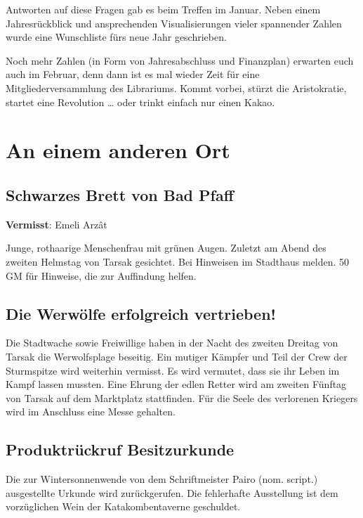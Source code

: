 Antworten auf diese Fragen gab es beim Treffen im Januar.
Neben einem Jahresrückblick und ansprechenden Visualisierungen vieler spannender Zahlen wurde eine Wunschliste fürs neue Jahr geschrieben.

Noch mehr Zahlen (in Form von Jahresabschluss und Finanzplan) erwarten euch auch im Februar, denn dann ist es mal wieder Zeit für eine Mitgliederversammlung des Librariums.
Kommt vorbei, stürzt die Aristokratie, startet eine Revolution … oder trinkt einfach nur einen Kakao.


\section{An einem anderen Ort}
\setsubsubsecheadstyle{\centering\bfseries}

\subsection{Schwarzes Brett von Bad Pfaff}
\begin{center}
    \textbf{Vermisst}:
    Emeli Arzât
\end{center}
\vspace{-1.5em}
\noindent
Junge, rothaarige Menschenfrau mit grünen Augen.
Zuletzt am Abend des zweiten Helmstag von Tarsak gesichtet.
Bei Hinweisen im Stadthaus melden.
50 GM für Hinweise, die zur Auffindung helfen.


\subsection{Die Werwölfe erfolgreich vertrieben!}

Die Stadtwache sowie Freiwillige haben in der Nacht des zweiten Dreitag von Tarsak die Werwolfsplage beseitig. 
Ein mutiger Kämpfer und Teil der Crew der Sturmspitze wird weiterhin vermisst. 
Es wird vermutet, dass sie ihr Leben im Kampf lassen mussten.
Eine Ehrung der edlen Retter wird am zweiten Fünftag von Tarsak auf dem Marktplatz stattfinden. Für die Seele des verlorenen Kriegers wird im Anschluss eine Messe gehalten.


\subsection{Produktrückruf Besitzurkunde}
Die zur Wintersonnenwende von dem Schriftmeister Pairo (nom. script.) ausgestellte Urkunde wird zurückgerufen.
Die fehlerhafte Ausstellung ist dem vorzüglichen Wein der Katakombentaverne geschuldet.

